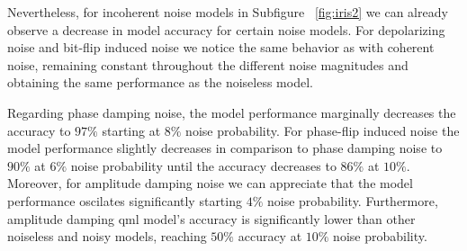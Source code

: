 Nevertheless, for incoherent noise models in Subfigure
~\ref{fig:iris2} we can already observe a decrease in
model accuracy for certain noise models. For depolarizing
noise and bit-flip induced noise we notice the same behavior
as with coherent noise, remaining constant throughout
the different noise magnitudes and obtaining the same
performance as the noiseless model. \

Regarding phase damping noise, the model performance
marginally decreases the accuracy to \(97\%\) starting at
\(8\%\) noise probability. For phase-flip induced noise
the model performance slightly decreases in comparison
to phase damping noise to \(90\%\) at \(6\%\) noise probability
until the accuracy decreases to \(86\%\) at \(10\%\). Moreover,
for amplitude damping noise we can appreciate that the model
performance oscilates significantly starting \(4\%\) noise
probability. Furthermore, amplitude damping \ac{qml}
model's accuracy is significantly lower than other noiseless
and noisy models, reaching \(50\%\) accuracy at \(10\%\)
noise probability. \

